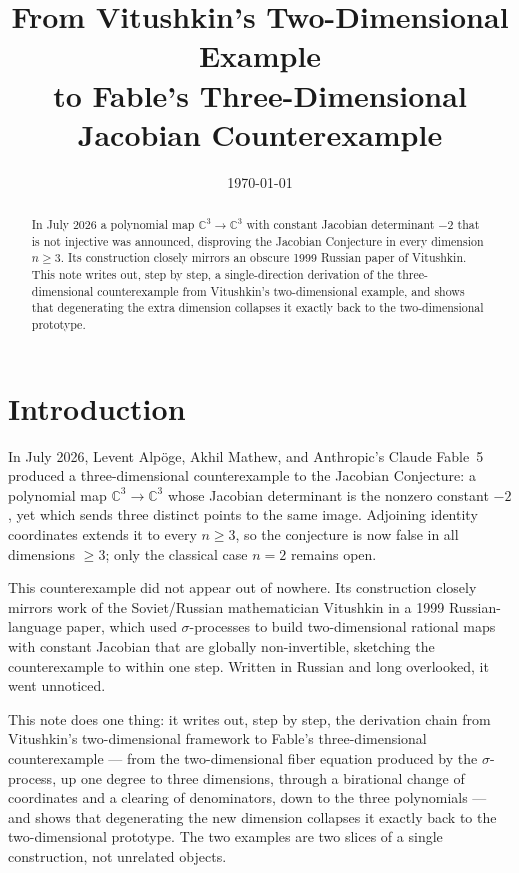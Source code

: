 \documentclass[11pt]{article}
\title{From Vitushkin's Two-Dimensional Example\\
       to Fable's Three-Dimensional Jacobian Counterexample}
\author{}
\date{\today}
\theoremstyle{plain}
\theoremstyle{definition}
\newcommand{\C}{\mathbb{C}}
\begin{document}
\maketitle

\begin{abstract}
In July 2026 a polynomial map $\C^3\to\C^3$ with constant Jacobian
determinant $-2$ that is not injective was announced, disproving the
Jacobian Conjecture in every dimension $n\ge 3$. Its construction closely
mirrors an obscure 1999 Russian paper of Vitushkin. This note writes out,
step by step, a single-direction derivation of the three-dimensional
counterexample from Vitushkin's two-dimensional example, and shows that
degenerating the extra dimension collapses it exactly back to the
two-dimensional prototype.
\end{abstract}

\section*{Introduction}
In July 2026, Levent Alp\"oge, Akhil Mathew, and Anthropic's Claude Fable~5
produced a three-dimensional counterexample to the Jacobian Conjecture:
a polynomial map $\C^3\to\C^3$ whose Jacobian determinant is the nonzero
constant $-2$, yet which sends three distinct points to the same image.
Adjoining identity coordinates extends it to every $n\ge 3$, so the
conjecture is now false in all dimensions $\ge 3$; only the classical case
$n=2$ remains open.

This counterexample did not appear out of nowhere. Its construction closely
mirrors work of the Soviet/Russian mathematician Vitushkin in a 1999
Russian-language paper, which used $\sigma$-processes to build
two-dimensional rational maps with constant Jacobian that are globally
non-invertible, sketching the counterexample to within one step. Written in
Russian and long overlooked, it went unnoticed.

This note does one thing: it writes out, step by step, the derivation chain
from Vitushkin's two-dimensional framework to Fable's three-dimensional
counterexample --- from the two-dimensional fiber equation produced by the
$\sigma$-process, up one degree to three dimensions, through a birational
change of coordinates and a clearing of denominators, down to the three
polynomials --- and shows that degenerating the new dimension collapses it
exactly back to the two-dimensional prototype. The two examples are two
slices of a single construction, not unrelated objects.
\end{document}
